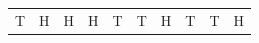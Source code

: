 {{\begin{center}
\begin{tabular}[t]{|l|l|l|l|l|l|l|l|l|l|}
        T &
    
    
        H &
    
    
        H &
    
    
        H &
    
    
        T &
    
    
        T &
    
    
        H &
    
    
        T &
    
    
        T &
    
    
        H%
     \tabularnewline\cline{1-1}\cline{2-2}\cline{3-3}\cline{4-4}\cline{5-5}\cline{6-6}\cline{7-7}\cline{8-8}\cline{9-9}\cline{10-10}
    

\end{tabular}
\end{center}}}
